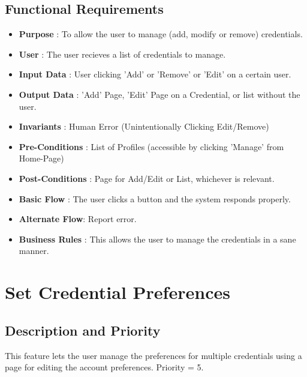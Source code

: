 \subsection{Functional Requirements}
\begin{itemize}
    \item \textbf{Purpose} : To allow the user to manage (add, modify or remove) credentials.
    \item \textbf{User} : The user recieves a list of credentials to manage.
    \item \textbf{Input Data} : User clicking 'Add' or 'Remove' or 'Edit' on a certain user.
    \item \textbf{Output Data} : 'Add' Page, 'Edit' Page on a Credential, or list without the user.
    \item \textbf{Invariants} : Human Error (Unintentionally Clicking Edit/Remove)
    \item \textbf{Pre-Conditions} : List of Profiles (accessible by clicking 'Manage' from Home-Page)
    \item \textbf{Post-Conditions} : Page for Add/Edit or List, whichever is relevant.
    \item \textbf{Basic Flow} : The user clicks a button and the system responds properly.
    \item \textbf{Alternate Flow}: Report error.
    \item \textbf{Business Rules} : This allows the user to manage the credentials in a sane manner.
\end{itemize}

\section{Set Credential Preferences}
\subsection{Description and Priority}
This feature lets the user manage the preferences for multiple credentials using a page for editing the account preferences.
Priority = 5.

